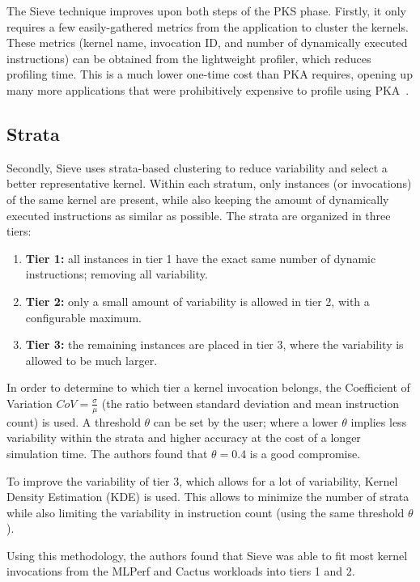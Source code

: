 The Sieve technique improves upon both steps of the PKS phase.
Firstly, it only requires a few easily-gathered metrics from the application to cluster the kernels.
These metrics (kernel name, invocation ID, and number of dynamically executed instructions) can be obtained from the lightweight profiler, which reduces profiling time.
This is a much lower one-time cost than PKA requires, opening up many more applications that were prohibitively expensive to profile using PKA\ .

\subsection{Strata}\label{subsec:strata}
Secondly, Sieve uses strata-based clustering to reduce variability and select a better representative kernel.
Within each stratum, only instances (or invocations) of the same kernel are present, while also keeping the amount of dynamically executed instructions as similar as possible.
The strata are organized in three tiers:
\begin{enumerate}
    \item \textbf{Tier 1:} all instances in tier 1 have the exact same number of dynamic instructions; removing all variability.
    \item \textbf{Tier 2:} only a small amount of variability is allowed in tier 2, with a configurable maximum.
    \item \textbf{Tier 3:} the remaining instances are placed in tier 3, where the variability is allowed to be much larger.
\end{enumerate}
In order to determine to which tier a kernel invocation belongs, the Coefficient of Variation $CoV = \frac{\sigma}{\mu}$ (the ratio between standard deviation and mean instruction count) is used.
A threshold $\theta$ can be set by the user; where a lower $\theta$ implies less variability within the strata and higher accuracy at the cost of a longer simulation time.
The authors found that $\theta = 0.4$ is a good compromise.

To improve the variability of tier 3, which allows for a lot of variability, Kernel Density Estimation (KDE) is used.
This allows to minimize the number of strata while also limiting the variability in instruction count (using the same threshold $\theta$).

Using this methodology, the authors found that Sieve was able to fit most kernel invocations from the MLPerf\cite{mlperf} and Cactus\cite{cactus} workloads into tiers 1 and 2.

